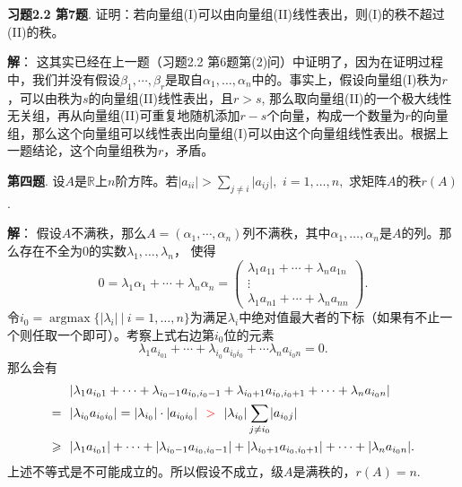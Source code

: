 \newpageorvspace

{\bf 习题2.2 第7题}. 证明：若向量组(I)可以由向量组(II)线性表出，则(I)的秩不超过(II)的秩。

\newpageorvspace

{\bf 解}： 这其实已经在上一题（习题2.2 第6题第(2)问）中证明了，因为在证明过程中，我们并没有假设$\beta_1, \cdots, \beta_r$是取自$\alpha_1, \ldots, \alpha_n$中的。事实上，假设向量组(I)秩为$r$，可以由秩为$s$的向量组(II)线性表出，且$r > s$, 那么取向量组(II)的一个极大线性无关组，再从向量组(II)可重复地随机添加$r-s$个向量，构成一个数量为$r$的向量组，那么这个向量组可以线性表出向量组(I)可以由这个向量组线性表出。根据上一题结论，这个向量组秩为$r$，矛盾。

\newpageorvspace

{\bf 第四题}. 设$A$是$\mathbb{R}$上$n$阶方阵。若$\lvert a_{ii} \rvert > \sum\limits_{j\neq i} \lvert a_{ij} \rvert,$ $i = 1, \ldots, n,$ 求矩阵$A$的秩$r(A)$.

\newpageorvspace

{\bf 解}： 假设$A$不满秩，那么$A = (\alpha_1, \cdots, \alpha_n)$列不满秩，其中$\alpha_1, \ldots, \alpha_n$是$A$的列。那么存在不全为0的实数$\lambda_1, \ldots, \lambda_n$， 使得
$$0 = \lambda_1 \alpha_1 + \cdots + \lambda_n \alpha_n = \begin{pmatrix} \lambda_1 a_{11} + \cdots + \lambda_n a_{1n} \\ \vdots \\ \lambda_1 a_{n1} + \cdots + \lambda_n a_{nn} \end{pmatrix}.$$
令$i_0 = \operatorname{argmax} \{ \lvert \lambda_i \rvert \ |\ i = 1, \ldots, n \}$为满足$\lambda_i$中绝对值最大者的下标（如果有不止一个则任取一个即可）。考察上式右边第$i_0$位的元素
$$\lambda_{1} a_{i_01} + \cdots + \lambda_{i_0} a_{i_0i_0} + \cdots \lambda_n a_{i_0n} = 0.$$
那么会有
\begin{align*}
& ~~ \lvert \lambda_{1} a_{i_01} + \cdots + \lambda_{i_0-1} a_{i_0,i_0-1} + \lambda_{i_0+1} a_{i_0,i_0+1} + \cdots + \lambda_n a_{i_0n} \rvert \\
= & ~~ \lvert \lambda_{i_0} a_{i_0i_0} \rvert = \lvert \lambda_{i_0} \rvert \cdot \lvert a_{i_0i_0} \rvert ~~ {\color{red} >} ~~ \lvert \lambda_{i_0} \rvert \sum\limits_{j\neq i_0} \lvert a_{i_0j} \rvert \\
\geqslant & ~~ \lvert \lambda_{1} a_{i_01} \rvert + \cdots + \lvert \lambda_{i_0-1} a_{i_0,i_0-1} \rvert + \lvert \lambda_{i_0+1} a_{i_0,i_0+1} \rvert + \cdots + \lvert \lambda_n a_{i_0n} \rvert.
\end{align*}
上述不等式是不可能成立的。所以假设不成立，级$A$是满秩的，$r(A) = n.$

